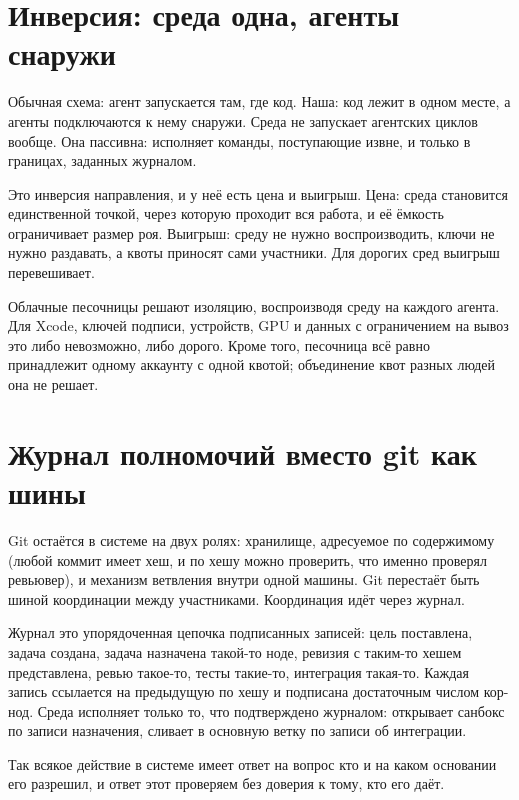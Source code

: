 \section{Инверсия: среда одна, агенты снаружи}

Обычная схема: агент запускается там, где код. Наша: код лежит в одном месте, а агенты подключаются к нему снаружи. Среда не запускает агентских циклов вообще. Она пассивна: исполняет команды, поступающие извне, и только в границах, заданных журналом.

Это инверсия направления, и у неё есть цена и выигрыш. Цена: среда становится единственной точкой, через которую проходит вся работа, и её ёмкость ограничивает размер роя. Выигрыш: среду не нужно воспроизводить, ключи не нужно раздавать, а квоты приносят сами участники. Для дорогих сред выигрыш перевешивает.

\begin{whybox}
Облачные песочницы решают изоляцию, воспроизводя среду на каждого агента. Для Xcode, ключей подписи, устройств, GPU и данных с ограничением на вывоз это либо невозможно, либо дорого. Кроме того, песочница всё равно принадлежит одному аккаунту с одной квотой; объединение квот разных людей она не решает.
\end{whybox}

\section{Журнал полномочий вместо git как шины}

Git остаётся в системе на двух ролях: хранилище, адресуемое по содержимому (любой коммит имеет хеш, и по хешу можно проверить, что именно проверял ревьювер), и механизм ветвления внутри одной машины. Git перестаёт быть шиной координации между участниками. Координация идёт через журнал.

Журнал это упорядоченная цепочка подписанных записей: цель поставлена, задача создана, задача назначена такой-то ноде, ревизия с таким-то хешем представлена, ревью такое-то, тесты такие-то, интеграция такая-то. Каждая запись ссылается на предыдущую по хешу и подписана достаточным числом кор-нод. Среда исполняет только то, что подтверждено журналом: открывает санбокс по записи назначения, сливает в основную ветку по записи об интеграции.

Так всякое действие в системе имеет ответ на вопрос кто и на каком основании его разрешил, и ответ этот проверяем без доверия к тому, кто его даёт.

